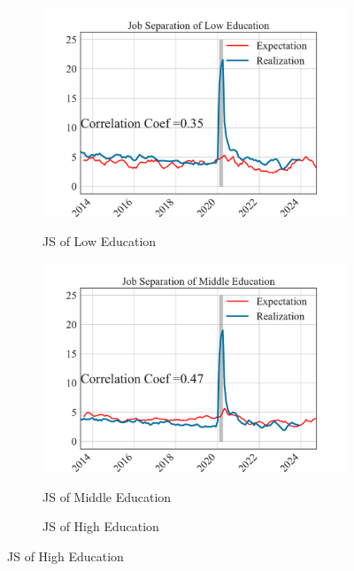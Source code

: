 \begin{figure}[pt]
    \begin{subfigure}{0.32\linewidth}
        \centering
        \caption{JS of Low Education}
        \includegraphics[width=\linewidth]{text/chapter2/Figures/expectation_realization_comparison_JS_EduLow.pdf}  
        \label{fig:subfig4}
    \end{subfigure}
    \begin{subfigure}{0.32\linewidth}
        \centering
        \caption{JS of Middle Education}
        \includegraphics[width=\linewidth]{text/chapter2/Figures/expectation_realization_comparison_JS_EduMid.pdf} 
        \label{fig:subfig5}
    \end{subfigure}
    \begin{subfigure}{0.32\linewidth}
        \centering
        \caption{JS of High Education}

\end{subfigure}
\end{figure}
